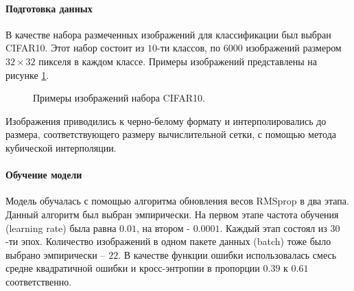 \paragraph{Подготовка данных}
В качестве набора размеченных изображений для классификации был выбран CIFAR10. Этот набор состоит из $10$-ти классов, по $6000$ изображений размером $32 \times 32$ пикселя в каждом классе. Примеры изображений представлены на рисунке \ref{ris:CIFAR10}.
\begin{figure}[h]
	\caption{Примеры изображений набора CIFAR10.}
	\label{ris:CIFAR10}
\end{figure}
Изображения приводились к черно-белому формату и интерполировались до размера, соответствующего размеру вычислительной сетки, с помощью метода кубической интерполяции.

\paragraph{Обучение модели}
Модель обучалась с помощью алгоритма обновления весов RMSprop в два этапа. Данный алгоритм был выбран эмпирически. На первом этапе частота обучения (learning rate) была равна $0.01$, на втором - $0.0001$. Каждый этап состоял из $30$-ти эпох. Количество изображений в одном пакете данных (batch) тоже было выбрано эмпирически -- $22$. В качестве функции ошибки использовалась смесь средне квадратичной ошибки и кросс-энтропии в пропорции $0.39$ к $0.61$ соответственно.